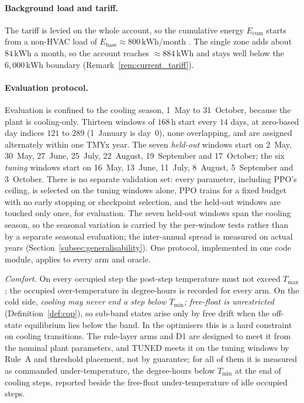 \documentclass[pdflatex,sn-mathphys-num,iicol]{sn-jnl}
\theoremstyle{thmstyleone}\newtheorem{proposition}{Proposition}\newtheorem{corollary}{Corollary}
\theoremstyle{thmstyletwo}\newtheorem{remark}{Remark}\newtheorem{observation}{Observation}
\theoremstyle{thmstylethree}\newtheorem{definition}{Definition}
\newcommand{\Tmin}{T_{\min}}
\newcommand{\Tmax}{T_{\max}}
\newcommand{\kWh}{\text{kWh}}
\begin{document}
\paragraph{Background load and tariff.}
The tariff is levied on the whole account, so the cumulative energy $E_{\mathrm{cum}}$ starts from a non-HVAC load of $E_{\mathrm{base}}\approx800\,\kWh$/month \citep{AlHomoud2021}. The single zone adds about $84\,\kWh$ a month, so the account reaches ${\approx}884\,\kWh$ and stays well below the $6{,}000\,\kWh$ boundary (Remark~\ref{rem:current_tariff}).

\paragraph{Evaluation protocol.}
\label{subsec:protocol}
Evaluation is confined to the cooling season, 1~May to 31~October, because the plant is cooling-only. Thirteen windows of $168\,$h start every $14$ days, at zero-based day indices $121$ to $289$ (1~January is day~$0$), none overlapping, and are assigned alternately within one TMYx year. The seven \emph{held-out} windows start on 2~May, 30~May, 27~June, 25~July, 22~August, 19~September and 17~October; the six \emph{tuning} windows start on 16~May, 13~June, 11~July, 8~August, 5~September and 3~October. There is no separate validation set: every parameter, including PPO's ceiling, is selected on the tuning windows alone, PPO trains for a fixed budget with no early stopping or checkpoint selection, and the held-out windows are touched only once, for evaluation. The seven held-out windows span the cooling season, so the seasonal variation is carried by the per-window tests rather than by a separate seasonal evaluation; the inter-annual spread is measured on actual years (Section~\ref{subsec:generalisability}). One protocol, implemented in one code module, applies to every arm and oracle.

\emph{Comfort.} On every occupied step the post-step temperature must not exceed $\Tmax$; the occupied over-temperature in degree-hours is recorded for every arm. On the cold side, \emph{cooling may never end a step below $\Tmin$; free-float is unrestricted} (Definition~\ref{def:cop}), so sub-band states arise only by free drift when the off-state equilibrium lies below the band. In the optimisers this is a hard constraint on cooling transitions. The rule-layer arms and D1 are designed to meet it from the nominal plant parameters, and TUNED meets it on the tuning windows by Rule~A and threshold placement, not by guarantee; for all of them it is measured as commanded under-temperature, the degree-hours below $\Tmin$ at the end of cooling steps, reported beside the free-float under-temperature of idle occupied steps.
\end{document}
